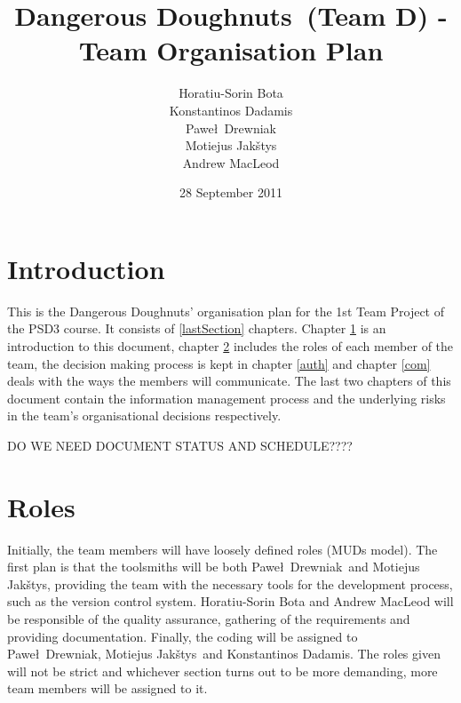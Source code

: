 \documentclass{article}
\newcommand{\pawel}{Pawe\l}
\newcommand{\jakstys}{Jak\v{s}tys}
\newcommand{\dnd}{Dangerous Doughnuts}
\begin{document}
\title{\dnd\ (Team D) - Team Organisation Plan} %
\author{Horatiu-Sorin Bota \\
		Konstantinos Dadamis \\
		\pawel\ Drewniak \\
		Motiejus \jakstys \\
		Andrew MacLeod} %

\date{28 September 2011}
\maketitle

\section{Introduction}
\label{intro}

This is the \dnd' organisation plan for the 1st Team
Project of the PSD3 course. It consists of \ref{lastSection}
chapters. Chapter \ref{intro} is an introduction to this document,
chapter \ref{role} includes the roles of each member of the team, the decision making process is kept in chapter \ref{auth} and chapter \ref{com} deals with the ways the members will communicate. The last two chapters of this document contain the information management process and the underlying risks in the team's organisational decisions respectively.

DO WE NEED DOCUMENT STATUS AND SCHEDULE????


\section{Roles}
\label{role}

Initially, the team members will have loosely defined roles (MUDs model). The first plan is that the toolsmiths will be both \pawel\ Drewniak\ and Motiejus \jakstys, providing the team with the necessary tools for the development process, such as the version control system. Horatiu-Sorin Bota and Andrew MacLeod will be responsible of the quality assurance, gathering of the requirements and providing documentation. Finally, the coding will be assigned to \pawel\ Drewniak, Motiejus \jakstys\ and Konstantinos Dadamis. The roles given will not be strict and whichever section turns out to be more demanding, more team members will be assigned to it.  
\end{document}
